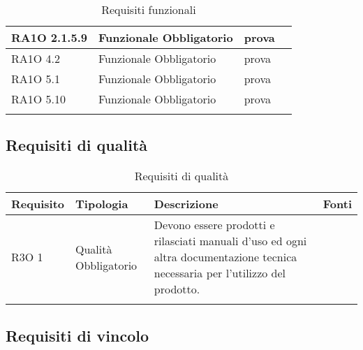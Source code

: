 \begin{center}
\begin{longtable}{ | l | p{2cm} | p{5cm} | p{1.7cm} |}
				RA1O 2.1.5.9 & Funzionale \newline  Obbligatorio  & prova &  \\ \hline      
				RA1O 4.2 & Funzionale \newline  Obbligatorio  & prova &  \\ \hline      
				RA1O 5.1 & Funzionale \newline  Obbligatorio  & prova &  \\ \hline      
				RA1O 5.10 & Funzionale \newline  Obbligatorio  & prova &  \\ \hline
			\caption{Requisiti funzionali}
			\end{longtable}
			\egroup
			\end{center}  
\clearpage

\subsection{Requisiti di qualità }

			\begin{center}
			\bgroup
			\def\arraystretch{1.8}
			\begin{longtable}{ | l | p{2cm} | p{5cm} | p{1.7cm} |}
		
			\cellcolor[gray]{0.9} \textbf{Requisito} & \cellcolor[gray]{0.9} \textbf{Tipologia} 
			& \cellcolor[gray]{0.9} \textbf{Descrizione} & \cellcolor[gray]{0.9} \textbf{Fonti} \\ \hline
      
				R3O 1 & Qualità \newline  Obbligatorio  & Devono essere prodotti e rilasciati manuali d'uso ed ogni altra documentazione tecnica necessaria per l’utilizzo del prodotto. &  \\ \hline
			\caption{Requisiti di qualità}
			\end{longtable}
			\egroup
			\end{center}  
\clearpage

\subsection{Requisiti di vincolo }


